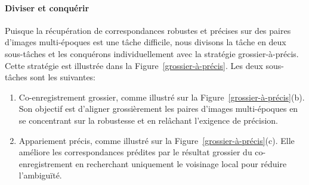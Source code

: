 \paragraph{Diviser et conquérir}
Puisque la récupération de correspondances robustes et précises sur des paires d'images multi-époques est une tâche difficile, nous divisons la tâche en deux sous-tâches et les conquérons individuellement avec la stratégie grossier-à-précis. Cette stratégie est illustrée dans la Figure~\ref{grossier-à-précis}. Les deux sous-tâches sont les suivantes:\\
\begin{enumerate}
	\item Co-enregistrement grossier, comme illustré sur la Figure~\ref{grossier-à-précis}(b). Son objectif est d'aligner grossièrement les paires d'images multi-époques en se concentrant sur la robustesse et en relâchant l'exigence de précision.
	\item Appariement précis, comme illustré sur la Figure~\ref{grossier-à-précis}(c). Elle améliore les correspondances prédites par le résultat grossier du co-enregistrement en recherchant uniquement le voisinage local pour réduire l'ambiguïté.
\end{enumerate}
